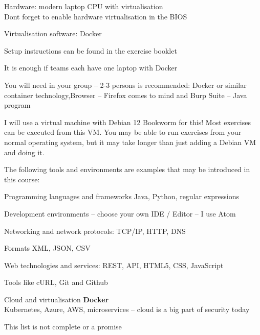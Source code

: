\documentclass[Screen16to9,17pt]{foils}
\begin{document}


\begin{list2}
\item Hardware: modern laptop CPU with virtualisation\\
Dont forget to enable hardware virtualisation in the BIOS
\item Virtualisation software: Docker
\item Setup instructions can be found in the exercise booklet
\end{list2}

\centerline{It is enough if teams each have one laptop with Docker}



You will need in your group -- 2-3 persons is recommended:
Docker or similar container technology,Browser -- Firefox comes to mind and Burp Suite -- Java program

I will use a virtual machine with Debian 12 Bookworm for this! Most exercises can be executed from this VM. You may be able to run exercises from your normal operating system, but it may take longer than just adding a Debian VM and doing it.


The following tools and environments are examples that may be introduced in this course:

\begin{list2}
\item Programming languages and frameworks Java, Python, regular expressions
\item Development environments -- choose your own IDE / Editor -- I use Atom
\item Networking and network protocols: TCP/IP, HTTP, DNS
\item Formats XML, JSON, CSV
\item Web technologies and services: REST, API, HTML5, CSS, JavaScript
\item Tools like cURL, Git and Github
\item Cloud and virtualisation {\bf Docker}\\
Kubernetes, Azure, AWS, microservices -- cloud is a big part of security today
\end{list2}

\centerline{This list is not complete or a promise }
\end{document}
